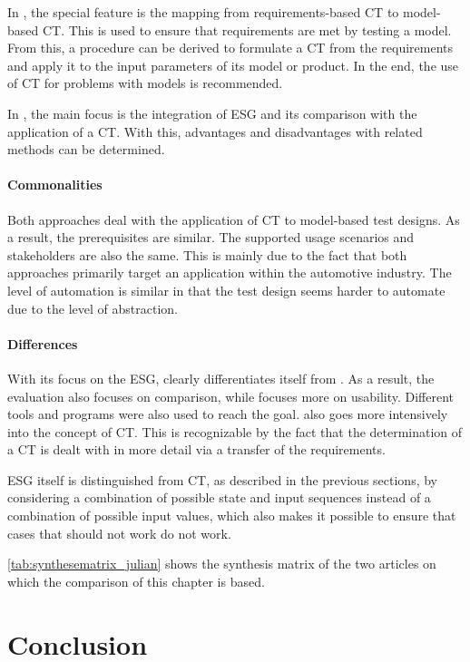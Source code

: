 In \cite{Conrad}, the special feature is the mapping from requirements-based CT to model-based CT. This is used to ensure that requirements are met by testing a model. From this, a procedure can be derived to formulate a CT from the requirements and apply it to the input parameters of its model or product. In the end, the use of CT for problems with models is recommended. 

In \cite{Belli}, the main focus is the integration of ESG and its comparison with the application of a CT. With this, advantages and disadvantages with related methods can be determined.

\paragraph{Commonalities}

Both approaches deal with the application of CT to model-based test designs. As a result, the prerequisites are similar. The supported usage scenarios and stakeholders are also the same. This is mainly due to the fact that both approaches primarily target an application within the automotive industry. The level of automation is similar in that the test design seems harder to automate due to the level of abstraction.

\paragraph{Differences}

With its focus on the ESG, \cite{Belli} clearly differentiates itself from \cite{Conrad}. As a result, the evaluation also focuses on comparison, while \cite{Conrad} focuses more on usability. Different tools and programs were also used to reach the goal. \cite{Conrad} also goes more intensively into the concept of CT. This is recognizable by the fact that the determination of a CT is dealt with in more detail via a transfer of the requirements.

ESG itself is distinguished from CT, as described in the previous sections, by considering a combination of possible state and input sequences instead of a combination of possible input values, which also makes it possible to ensure that cases that should not work do not work.

\autoref{tab:synthesematrix_julian} shows the synthesis matrix of the two articles on which the comparison of this chapter is based. 

\section{Conclusion}
\label{Kap:Conclusion}

